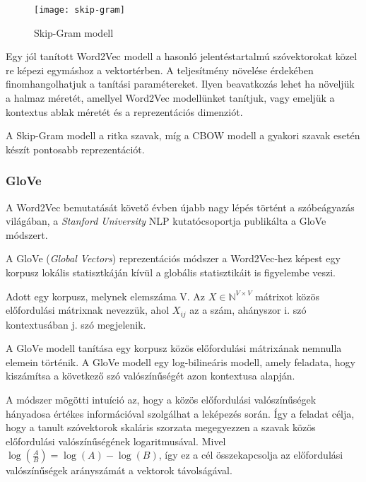 \begin{figure}[H]
	\centering
	\texttt{[image: skip-gram]}
	\caption{Skip-Gram modell}
\end{figure}

Egy jól tanított Word2Vec modell a hasonló jelentéstartalmú szóvektorokat közel re képezi egymáshoz a vektortérben. 
A teljesítmény növelése érdekében finomhangolhatjuk a tanítási paramétereket. Ilyen beavatkozás lehet ha növeljük a halmaz méretét, amellyel Word2Vec modellünket tanítjuk, vagy emeljük a kontextus ablak méretét és a reprezentációs dimenziót.

\begin{note}
	A Skip-Gram modell a ritka szavak, míg a CBOW modell a gyakori szavak esetén készít pontosabb reprezentációt.
\end{note}


\subsubsection{GloVe}
A Word2Vec bemutatását követő évben újabb nagy lépés történt a szóbeágyazás világában, a \textit{Stanford University} NLP kutatócsoportja publikálta a GloVe módszert.

A GloVe (\textit{Global Vectors}) \cite{pennington2014glove} reprezentációs módszer a Word2Vec-hez képest egy korpusz lokális statisztkáján kívül a globális statisztikáit is figyelembe veszi. 

\begin{definition}
	Adott egy korpusz, melynek elemszáma V. Az $X \in \mathbb{N}^{V \times V}$ mátrixot közös előfordulási mátrixnak nevezzük, ahol $X_{ij}$ az a szám, ahányszor i. szó kontextusában j. szó megjelenik.  
\end{definition}

A GloVe modell tanítása egy korpusz közös előfordulási mátrixának nemnulla elemein történik. A GloVe modell egy log-bilineáris modell, amely feladata, hogy kiszámítsa a következő szó valószínűségét azon kontextusa alapján.

A módszer mögötti intuíció az, hogy a közös előfordulási valószínűségek hányadosa értékes információval szolgálhat a leképezés során. Így a feladat célja, hogy a tanult szóvektorok skaláris szorzata megegyezzen a szavak közös előfordulási valószínűségének logaritmusával. Mivel $\log \left( \frac{A}{B} \right) = \log \left( A \right) - \log \left( B \right)$, így ez a cél összekapcsolja az előfordulási valószínűségek arányszámát a vektorok távolságával.

